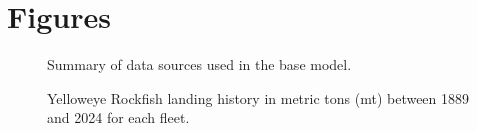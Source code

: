 \documentclass[
]{scrartcl}
\begin{document}
\pagebreak

\newpage{}

\section{Figures}\label{figures}

\begin{figure}


\caption{\label{fig-data}Summary of data sources used in the base
model.}

\end{figure}%

\begin{figure}


\caption{\label{fig-catch}Yelloweye Rockfish landing history in metric
tons (mt) between 1889 and 2024 for each fleet.}

\end{figure}%
\end{document}
